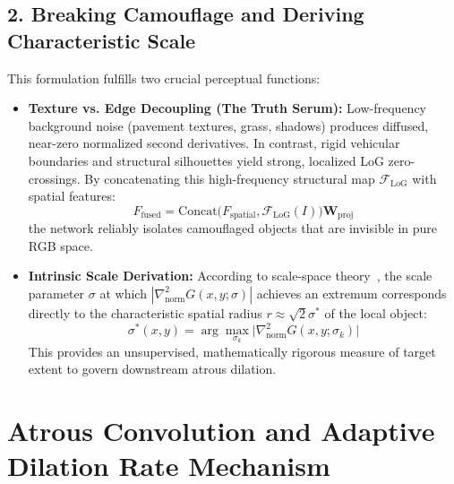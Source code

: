 \documentclass[12pt,a4paper]{report}
\begin{document}
\subsection{2. Breaking Camouflage and Deriving Characteristic Scale}
This formulation fulfills two crucial perceptual functions:
\begin{itemize}
    \item \textbf{Texture vs. Edge Decoupling (The Truth Serum):} Low-frequency background noise (pavement textures, grass, shadows) produces diffused, near-zero normalized second derivatives. In contrast, rigid vehicular boundaries and structural silhouettes yield strong, localized LoG zero-crossings. By concatenating this high-frequency structural map $\mathcal{F}_{\text{LoG}}$ with spatial features:
    \begin{equation}
        F_{\text{fused}} = \text{Concat}\big(F_{\text{spatial}}, \mathcal{F}_{\text{LoG}}(I)\big) \mathbf{W}_{\text{proj}}
    \end{equation}
    the network reliably isolates camouflaged objects that are invisible in pure RGB space.
    \item \textbf{Intrinsic Scale Derivation:} According to scale-space theory~\cite{lindeberg1994scale}, the scale parameter $\sigma$ at which $|\nabla^2_{\text{norm}} G(x, y; \sigma)|$ achieves an extremum corresponds directly to the characteristic spatial radius $r \approx \sqrt{2}\sigma^*$ of the local object:
    \begin{equation}
        \sigma^*(x, y) = \arg\max_{\sigma_k} \Big| \nabla^2_{\text{norm}} G(x, y; \sigma_k) \Big|
    \end{equation}
    This provides an unsupervised, mathematically rigorous measure of target extent to govern downstream atrous dilation.
\end{itemize}

\section{Atrous Convolution and Adaptive Dilation Rate Mechanism}
\end{document}
